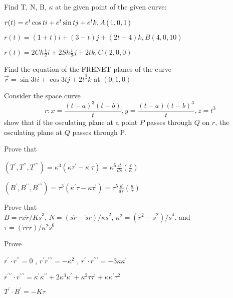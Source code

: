 \documentclass[11pt]{amsbook}
\begin{document}
% 
 \begin{hEnumerateArabic}
  \setcounter{enumi}{207}
  
  \item
  Find T, N, B, $\kappa$ at he given point of the given curve: \\
     \begin{hEnumerateAlpha}
       \item 
       $r(t) = e^t\cos t i + e^t\sin t j + e^tk, A \left( \, 1,0,1 \, \right) $
       \item
       $r(t) = (1+t)i + (3-t)j + (2t+4)k, B(4,0,10)$
       \item
       $r(t) = 2 Ch\frac{t}{2}i + 2Sh\frac{t}{2}j + 2tk, C(2,0,0)$
     \end{hEnumerateAlpha}
  \item
  Find the equation of the FRENET planes of the curve \\
  $\vec r = \sin 3ti + \cos 3tj + 2t^{\frac{3}{2}}k$ at $(0,1,0)$
  
  \item
  Consider the space curve \\
  $$r: x = \frac{(t-a)^3(t-b)}{t} , y = \frac{(t-a)(t-b)^3}{t} , z = t^3$$
  show that if the osculating plane at a point $P$ passes through $Q$ on $r$, the osculating plane at $Q$ passes through P.
  
  \item
  Prove that
  \begin{hEnumerateAlpha}
       \item 
       $(T^\prime,T^{\prime\prime}, T^{\prime\prime\prime}) = \kappa^3(\kappa \tau^\prime-\kappa^\prime\tau) = \kappa^5 \frac{d}{ds}(\frac{\tau}{\kappa})$
       \item
       $(B^\prime,B^{\prime\prime}, B^{\prime\prime\prime}) = \tau^3(\kappa^\prime\tau - \kappa \tau^\prime) = \tau^5 \frac{d}{ds}(\frac{\kappa}{\tau})$
  \end{hEnumerateAlpha}
  
  \item
  Prove that \\
  $ B = \dot r x \ddot r / K \dot s^3$, $N = (\dot s \ddot r- \ddot s \dot r) / \kappa \dot s^2$, $\kappa^2 = (\ddot r^2 - \dot s^2)/\dot s^4$. and \\
  $ \tau = (\dot r \ddot r \dddot r)/\kappa^2\dot s^6$
  
  \item 
  Prove 
  \begin{hEnumerateAlpha}
       \item 
       $r^\prime \cdot r^{\prime\prime} = 0$ , $r^\prime r^{\prime\prime\prime} = -\kappa^2$ , $r^\prime \cdot r^{\prime\prime\prime} = -3\kappa\kappa^\prime$
       \item
       $r^{\prime\prime\prime} \cdot r^{\prime\prime\prime} = \kappa^\prime \kappa^{\prime \prime} + 2 \kappa^3 \kappa^\prime + \kappa^2\tau\tau^\prime + \kappa\kappa^\prime\tau^2$
       \item
       $T^\prime \cdot B^\prime = -K\tau$
  \end{hEnumerateAlpha}
  

\end{hEnumerateArabic}
\end{document}
